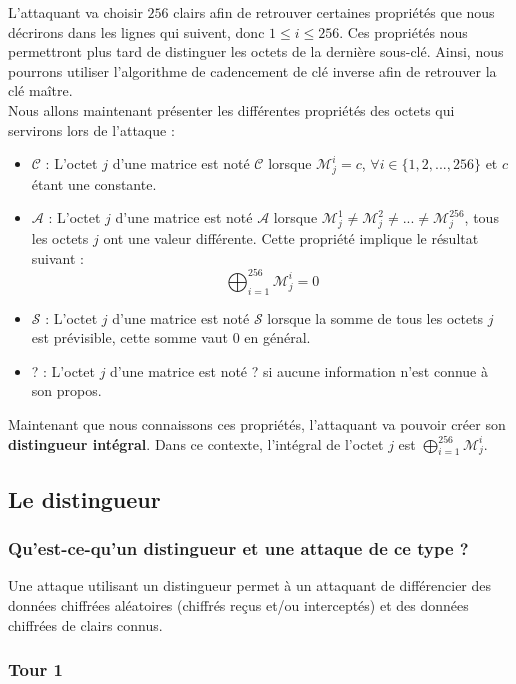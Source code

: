 \indent L'attaquant va choisir $256$ clairs afin de retrouver certaines propriétés que nous décrirons dans les lignes qui suivent, donc $1 \leq i \leq 256$. Ces propriétés nous permettront plus tard de distinguer les octets de la dernière sous-clé. Ainsi, nous pourrons utiliser l'algorithme de cadencement de clé inverse afin de retrouver la clé maître. \\
Nous allons maintenant présenter les différentes propriétés des octets qui servirons lors de l'attaque :
\begin{itemize}
    \item $\mathcal{C}$ : L'octet $j$ d'une matrice est noté $\mathcal{C}$ lorsque $\mathcal{M}_{j}^{i} = c$, $\forall i \in \{ 1, 2, ... , 256 \}$ et $c$ étant une constante.
    \item $\mathcal{A}$ : L'octet $j$ d'une matrice est noté $\mathcal{A}$ lorsque $\mathcal{M}_{j}^{1} \neq \mathcal{M}_{j}^{2} \neq ... \neq \mathcal{M}_{j}^{256}$, tous les octets $j$ ont une valeur différente. Cette propriété implique le résultat suivant : \\
    $$
    \bigoplus_{i=1}^{256} \mathcal{M}_{j}^{i} = 0
    $$
    \item $\mathcal{S}$ : L'octet $j$ d'une matrice est noté $\mathcal{S}$ lorsque la somme de tous les octets $j$ est prévisible, cette somme vaut 0 en général.
    \item ? :  L'octet $j$ d'une matrice est noté ? si aucune information n'est connue à son propos.
\end{itemize}

\indent Maintenant que nous connaissons ces propriétés, l'attaquant va pouvoir créer son \textbf{distingueur intégral}. Dans ce contexte, l'intégral de l'octet $j$ est $\bigoplus_{i=1}^{256} \mathcal{M}_{j}^{i}$.

\subsection{Le distingueur}

\subsubsection{Qu'est-ce-qu'un distingueur et une attaque de ce type ?}
Une attaque utilisant un distingueur permet à un attaquant de différencier des données chiffrées aléatoires (chiffrés reçus et/ou interceptés) et des données chiffrées de clairs connus.

\subsubsection{Tour 1}

